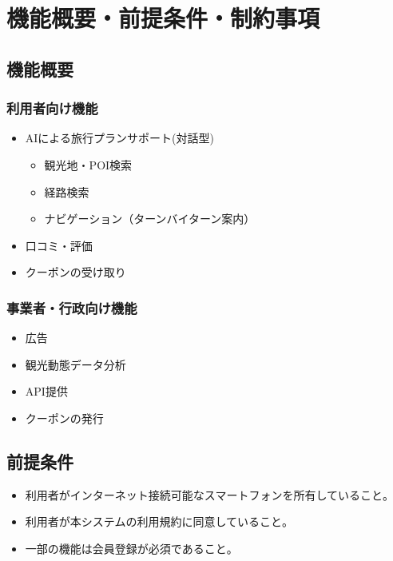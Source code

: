 \documentclass{docs}
\begin{document}
\section{機能概要・前提条件・制約事項}

\subsection{機能概要}
\subsubsection{利用者向け機能}
\begin{itemize}
	\item AIによる旅行プランサポート(対話型)
\begin{itemize}
	\item 観光地・POI検索
	\item 経路検索
	\item ナビゲーション（ターンバイターン案内）
\end{itemize}
	\item 口コミ・評価
	\item クーポンの受け取り
\end{itemize}

\subsubsection{事業者・行政向け機能}
\begin{itemize}
	\item 広告
	\item 観光動態データ分析
	\item API提供
	\item クーポンの発行
\end{itemize}

\subsection{前提条件}
\begin{itemize}
	\item 利用者がインターネット接続可能なスマートフォンを所有していること。
	\item 利用者が本システムの利用規約に同意していること。
	\item 一部の機能は会員登録が必須であること。
\end{itemize}
\end{document}
